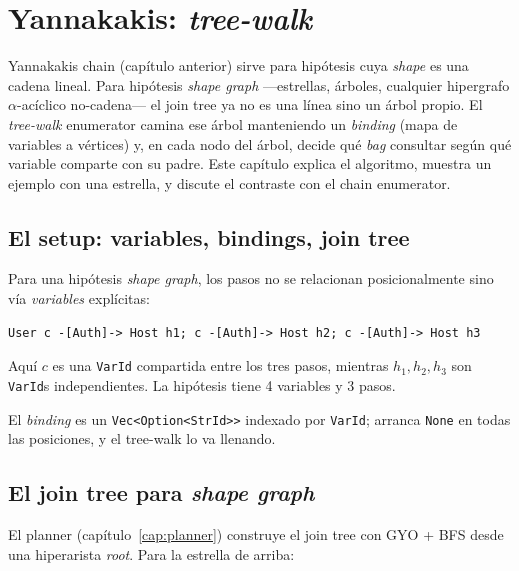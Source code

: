 \chapter{Yannakakis: \emph{tree-walk}}
\label{cap:yannakakis-tree}

\begin{intuicion}
Yannakakis chain (capítulo anterior) sirve para hipótesis cuya
\emph{shape} es una cadena lineal. Para hipótesis \emph{shape
graph} ---estrellas, árboles, cualquier hipergrafo
\(\alpha\)-acíclico no-cadena--- el join tree ya no es una línea
sino un árbol propio. El \emph{tree-walk} enumerator camina ese
árbol manteniendo un \emph{binding} (mapa de variables a vértices)
y, en cada nodo del árbol, decide qué \emph{bag} consultar según
qué variable comparte con su padre. Este capítulo explica el
algoritmo, muestra un ejemplo con una estrella, y discute el
contraste con el chain enumerator.
\end{intuicion}

\section{El setup: variables, bindings, join tree}

Para una hipótesis \emph{shape graph}, los pasos no se relacionan
posicionalmente sino vía \emph{variables} explícitas:

\begin{lstlisting}
User c -[Auth]-> Host h1; c -[Auth]-> Host h2; c -[Auth]-> Host h3
\end{lstlisting}

\noindent
Aquí \(c\) es una \texttt{VarId} compartida entre los tres pasos,
mientras \(h_1, h_2, h_3\) son \texttt{VarId}s independientes. La
hipótesis tiene 4 variables y 3 pasos.

El \emph{binding} es un \texttt{Vec<Option<StrId>>} indexado por
\texttt{VarId}; arranca \texttt{None} en todas las posiciones, y
el tree-walk lo va llenando.

\section{El join tree para \emph{shape graph}}

El planner (capítulo~\ref{cap:planner}) construye el join tree con
GYO + BFS desde una hiperarista \emph{root}. Para la estrella de
arriba:

